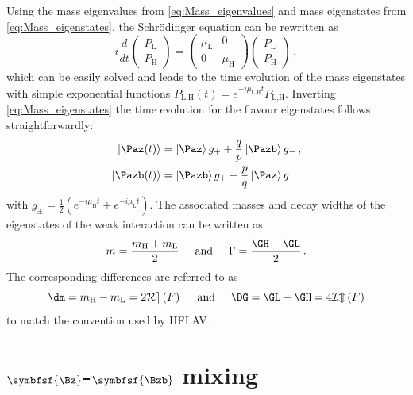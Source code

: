 Using the mass eigenvalues from \cref{eq:Mass_eigenvalues} and mass eigenstates from \cref{eq:Mass_eigenstates}, the Schrödinger equation can be rewritten as
\begin{equation}
i\frac{d}{dt}\begin{pmatrix} P_\text{L} \\ P_\text{H} \end{pmatrix} = \begin{pmatrix} \mu_\text{L} & 0 \\ 0 & \mu_\text{H} \end{pmatrix}\begin{pmatrix} P_\text{L} \\ P_\text{H} \end{pmatrix}\,,
\end{equation}
which can be easily solved and leads to the time evolution of the mass eigenstates with simple exponential functions $P_\text{L,H}(t)=e^{-i\mu_\text{L,H}t}P_\text{L,H}$.
Inverting \cref{eq:Mass_eigenstates} the time evolution for the flavour eigenstates follows straightforwardly:
\begin{equation}
\begin{split}
\left|\Paz\!\left(t\right)\right>&=\left|\Paz\right>g_++\frac{q}{p}\left|\Pazb\right>g_-\,,\\
\left|\Pazb\!\left(t\right)\right>&=\left|\Pazb\right>g_++\frac{p}{q}\left|\Paz\right>g_-\label{eq:timeEvolution}
\end{split}
\end{equation}
with $g_\pm=\frac{1}{2}\left(e^{-i\mu_\text{H}t}\pm e^{-i\mu_\text{L}t}\right)$.
The associated masses and decay widths of the eigenstates of the weak interaction can be written as
\begin{equation}
m=\frac{m_\text{H}+m_\text{L}}{2}\hspace{0.5cm}\text{and}\hspace{0.5cm}\Gamma=\frac{\GH+\GL}{2}\,.
\end{equation}
The corresponding differences are referred to as
\begin{equation}
\dm=m_\text{H}-m_\text{L}=2\mathcal{Re}\left(F\right)\hspace{0.5cm}\text{and}\hspace{0.5cm}\DG=\GL-\GH=4\mathcal{Im}\left(F\right)\label{eq:define_dmAndDG}
\end{equation}
to match the convention used by \ac{HFLAV}~\cite{HFLAV2016}.

\section[head={\Bz-\Bzb mixing},tocentry={\Bz-\Bzb mixing}]{$\symbfsf{\Bz}$-$\symbfsf{\Bzb}$ mixing}
\label{sec:BBbarMixing}

